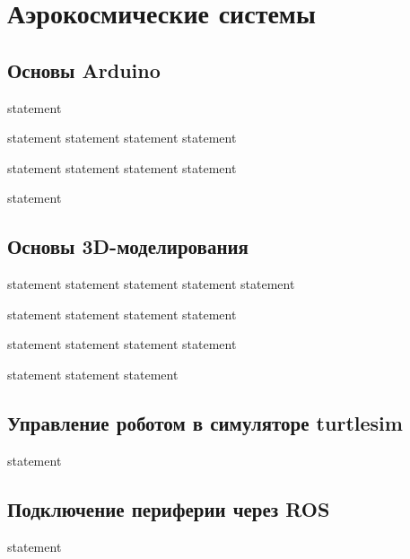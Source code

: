 \chapter{Аэрокосмические системы}

\section{Основы Arduino}

{statement}

{statement}
{statement}
{statement}
{statement}

{statement}
{statement}
{statement}
{statement}

{statement}

\section{Основы 3D-моделирования}

{statement}
{statement}
{statement}
{statement}
{statement}

{statement}
{statement}
{statement}
{statement}

{statement}
{statement}
{statement}
{statement}

{statement}
{statement}
{statement}

\section{Управление роботом в симуляторе turtlesim}

{statement}

\section{Подключение периферии через ROS}

{statement}